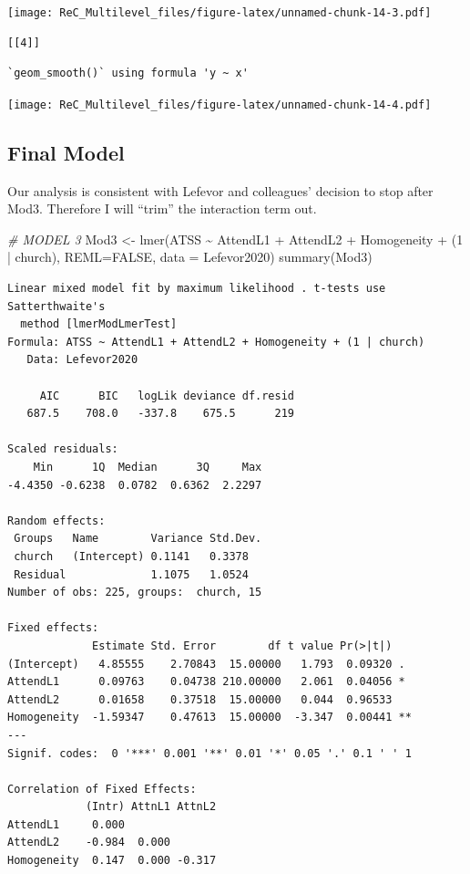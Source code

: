 \documentclass[
  english,
]{book}
\newenvironment{Shaded}{\begin{snugshade}}{\end{snugshade}}
\newcommand{\AttributeTok}[1]{\textcolor[rgb]{0.77,0.63,0.00}{#1}}
\newcommand{\CommentTok}[1]{\textcolor[rgb]{0.56,0.35,0.01}{\textit{#1}}}
\newcommand{\ConstantTok}[1]{\textcolor[rgb]{0.00,0.00,0.00}{#1}}
\newcommand{\DecValTok}[1]{\textcolor[rgb]{0.00,0.00,0.81}{#1}}
\newcommand{\FunctionTok}[1]{\textcolor[rgb]{0.00,0.00,0.00}{#1}}
\newcommand{\NormalTok}[1]{#1}
\newcommand{\OtherTok}[1]{\textcolor[rgb]{0.56,0.35,0.01}{#1}}
\newcommand{\SpecialCharTok}[1]{\textcolor[rgb]{0.00,0.00,0.00}{#1}}
\begin{document}
\texttt{[image: ReC\_Multilevel\_files/figure-latex/unnamed-chunk-14-3.pdf]}

\begin{verbatim}
[[4]]
\end{verbatim}

\begin{verbatim}
`geom_smooth()` using formula 'y ~ x'
\end{verbatim}

\texttt{[image: ReC\_Multilevel\_files/figure-latex/unnamed-chunk-14-4.pdf]}

\hypertarget{final-model}{%
\subsection{Final Model}\label{final-model}}

Our analysis is consistent with Lefevor and colleagues' decision to stop after Mod3. Therefore I will ``trim'' the interaction term out.

\begin{Shaded}
\begin{Highlighting}[]
\CommentTok{\# MODEL 3}
\NormalTok{Mod3 }\OtherTok{\textless{}{-}} \FunctionTok{lmer}\NormalTok{(ATSS }\SpecialCharTok{\textasciitilde{}}\NormalTok{ AttendL1 }\SpecialCharTok{+}\NormalTok{ AttendL2 }\SpecialCharTok{+}\NormalTok{ Homogeneity }\SpecialCharTok{+}\NormalTok{ (}\DecValTok{1} \SpecialCharTok{|}\NormalTok{ church), }\AttributeTok{REML=}\ConstantTok{FALSE}\NormalTok{, }\AttributeTok{data =}\NormalTok{ Lefevor2020)}
\FunctionTok{summary}\NormalTok{(Mod3)}
\end{Highlighting}
\end{Shaded}

\begin{verbatim}
Linear mixed model fit by maximum likelihood . t-tests use Satterthwaite's
  method [lmerModLmerTest]
Formula: ATSS ~ AttendL1 + AttendL2 + Homogeneity + (1 | church)
   Data: Lefevor2020

     AIC      BIC   logLik deviance df.resid 
   687.5    708.0   -337.8    675.5      219 

Scaled residuals: 
    Min      1Q  Median      3Q     Max 
-4.4350 -0.6238  0.0782  0.6362  2.2297 

Random effects:
 Groups   Name        Variance Std.Dev.
 church   (Intercept) 0.1141   0.3378  
 Residual             1.1075   1.0524  
Number of obs: 225, groups:  church, 15

Fixed effects:
             Estimate Std. Error        df t value Pr(>|t|)   
(Intercept)   4.85555    2.70843  15.00000   1.793  0.09320 . 
AttendL1      0.09763    0.04738 210.00000   2.061  0.04056 * 
AttendL2      0.01658    0.37518  15.00000   0.044  0.96533   
Homogeneity  -1.59347    0.47613  15.00000  -3.347  0.00441 **
---
Signif. codes:  0 '***' 0.001 '**' 0.01 '*' 0.05 '.' 0.1 ' ' 1

Correlation of Fixed Effects:
            (Intr) AttnL1 AttnL2
AttendL1     0.000              
AttendL2    -0.984  0.000       
Homogeneity  0.147  0.000 -0.317
\end{verbatim}
\end{document}
